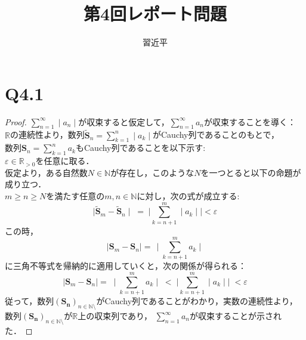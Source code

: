 \documentclass{jarticle}
\begin{document}
\title{第4回レポート問題}
\author{習近平}
\maketitle
\section*{Q4.1}
\begin{proof}
$\sum\limits_{n=1}^{\infty} \mid a_{n} \mid$が収束すると仮定して，$\sum\limits_{n=1}^{\infty} a_{n} $が収束することを導く：\\
$\mathbb{R}$の連続性より，数列$ \mathbf{\widetilde{S}}_{n} = \sum\limits_{k=1}^{n} \mid a_{k} \mid$がCauchy列であることのもとで，\\
数列$\mathbf{S}_{n} = \sum\limits_{k=1}^{n} a_{k} $もCauchy列であることを以下示す:\\
$\varepsilon \in \mathbb{R}_{>0} $を任意に取る．\\
仮定より，ある自然数$N \in \mathbb{N}$が存在し，このような$N$を一つとると以下の命題が成り立つ．\\
$m \ge n \ge N$を満たす任意の$m,n \in \mathbb{N}$に対し，次の式が成立する:\\
$$
\mid \mathbf{\widetilde{S}}_{m} - \mathbf{\widetilde{S}}_{n} \mid \; = \;  \bm{\mid} \sum_{k=n+1}^{m} \mid a_{k} \mid \bm{\mid}< \varepsilon
$$
この時，\\
$$
\mid \mathbf{S}_{m} - \mathbf{S}_{n} \mid =\, \mid \sum_{k=n+1}^{m}  a_{k}  \mid
$$
に三角不等式を帰納的に適用していくと，次の関係が得られる：\\
$$
\mid \mathbf{S}_{m} - \mathbf{S}_{n} \mid =\; \mid \sum_{k=n+1}^{m}  a_{k}  \mid\; < \;\bm{\mid} \sum_{k=n+1}^{m} \mid a_{k} \mid \bm{\mid} \; < \varepsilon
$$
従って，数列$(\mathbf{S_{n}})_{n \in \mathbb{N}\setminus }$がCauchy列であることがわかり，実数の連続性より，数列$(\mathbf{S_{n}})_{n \in \mathbb{N}\setminus }$が$\mathbb{R}$上の収束列であり，
$\sum\limits_{n=1}^{\infty} a_{n} $が収束することが示された．
\end{proof}
\end{document}
